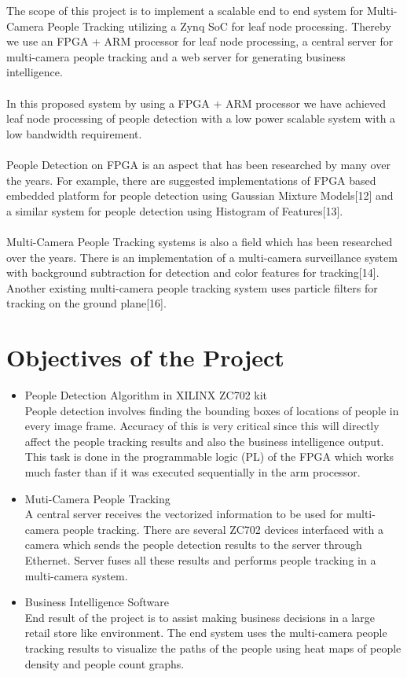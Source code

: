 \documentclass[12pt,a4paper]{report}
\begin{document}
The scope of this project is to implement a scalable end to end system for Multi-Camera People Tracking utilizing a Zynq SoC for leaf node processing. Thereby we use an FPGA + ARM processor for leaf node processing, a central server for multi-camera people tracking and a web server for generating business intelligence.\\\\
In this proposed system by using a FPGA + ARM processor we have achieved leaf node processing of people detection with a low power scalable system with a low bandwidth requirement. \\\\
People Detection on FPGA is an aspect that has been researched by many over the
years. For example, there are suggested implementations of FPGA based embedded platform for people detection using Gaussian Mixture Models[12] and a similar system for people detection using Histogram of Features[13].\\\\
Multi-Camera People Tracking systems is also a field which has been researched over the years. There is an implementation of a multi-camera surveillance system with background subtraction for detection and color features for tracking[14]. Another existing multi-camera people tracking system uses particle filters for tracking on the ground plane[16].

\section{Objectives of the Project }

\begin{itemize}
\item  People Detection Algorithm in XILINX ZC702 kit\\
People detection involves finding the bounding boxes of locations of people in every image frame. Accuracy of this is very critical since this will directly affect the people tracking results and also the business intelligence output. This task is done in the programmable logic (PL) of the FPGA which works much faster than if it was executed sequentially in the arm processor. 

\item Muti-Camera People Tracking\\
A central server receives the vectorized information to be used for multi-camera people tracking. There are several ZC702 devices interfaced with a camera which sends the people detection results to the server through Ethernet. Server fuses all these results and performs people tracking in a multi-camera system. 

\item  Business Intelligence Software \\
End result of the project is to assist making business decisions in a large retail store like environment. The end system uses the multi-camera people tracking results to visualize the paths of the people using heat maps of people density and people count graphs.



\end{itemize}
\newpage
\end{document}
